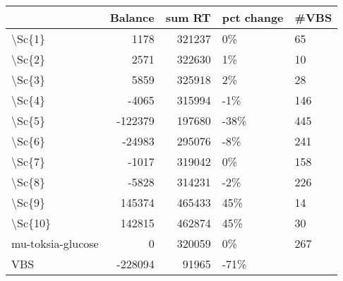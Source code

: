 \begin{tabular}{lrrll}
\toprule
{} &  Balance &  sum RT & pct change & \#VBS \\
\midrule
\textbackslash Sc\{1\}            &     1178 &  321237 &         0\% &   65 \\
\textbackslash Sc\{2\}            &     2571 &  322630 &         1\% &   10 \\
\textbackslash Sc\{3\}            &     5859 &  325918 &         2\% &   28 \\
\textbackslash Sc\{4\}            &    -4065 &  315994 &        -1\% &  146 \\
\textbackslash Sc\{5\}            &  -122379 &  197680 &       -38\% &  445 \\
\textbackslash Sc\{6\}            &   -24983 &  295076 &        -8\% &  241 \\
\textbackslash Sc\{7\}            &    -1017 &  319042 &         0\% &  158 \\
\textbackslash Sc\{8\}            &    -5828 &  314231 &        -2\% &  226 \\
\textbackslash Sc\{9\}            &   145374 &  465433 &        45\% &   14 \\
\textbackslash Sc\{10\}           &   142815 &  462874 &        45\% &   30 \\
mu-toksia-glucose &        0 &  320059 &         0\% &  267 \\
VBS               &  -228094 &   91965 &       -71\% &      \\
\bottomrule
\end{tabular}
